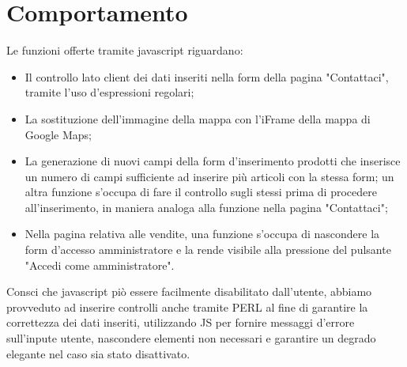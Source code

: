 \section{Comportamento}{
	Le funzioni offerte tramite javascript riguardano: 
	\begin{itemize}
		\item Il controllo lato client dei dati inseriti nella form della pagina "Contattaci", tramite l'uso d'espressioni regolari;
		\item La sostituzione dell'immagine della mappa con l'iFrame della mappa di Google Maps;
		\item La generazione di nuovi campi della form d'inserimento prodotti che inserisce un numero di campi sufficiente ad inserire più articoli con la stessa form; un altra funzione s'occupa di fare il controllo sugli stessi prima di procedere all'inserimento, in maniera analoga alla funzione nella pagina "Contattaci";
		\item Nella pagina relativa alle vendite, una funzione s'occupa di nascondere la form d'accesso amministratore e la rende visibile alla pressione del pulsante "Accedi come amministratore".
	\end{itemize}
	Consci che javascript piò essere facilmente disabilitato dall'utente, abbiamo provveduto ad inserire controlli anche tramite PERL al fine di garantire la correttezza dei dati inseriti, utilizzando JS per fornire messaggi d'errore sull'inpute utente, nascondere elementi non necessari e garantire un degrado elegante nel caso sia stato disattivato.
}